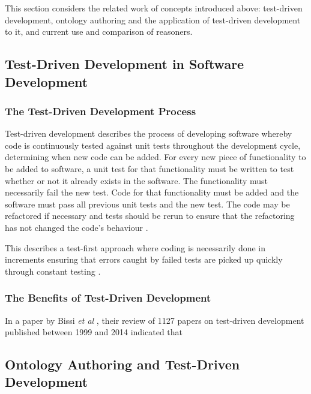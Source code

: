 \documentclass[draft]{sig-alternate-05-2015}
\newcommand{\todo}[1][]{\ifdraft{\ifthenelse{\isempty{#1}}{\hl{(TODO)}}{\hl{(TODO: #1)}}}{}}
\begin{document}
This section considers the related work of concepts introduced above: test-driven development, ontology authoring and the application of test-driven development to it, and current use and comparison of reasoners.

\subsection{Test-Driven Development in Software Development}

\subsubsection{The Test-Driven Development Process}

Test-driven development describes the process of developing software whereby code is continuously tested against unit tests throughout the development cycle, determining when new code can be added. For every new piece of functionality to be added to software, a unit test for that functionality must be written to test whether or not it already exists in the software. The functionality must necessarily fail the new test. Code for that functionality must be added and the software must pass all previous unit tests and the new test. The code may be refactored if necessary and tests should be rerun to ensure that the refactoring has not changed the code's behaviour \cite{kumar2013comparative,DBLP:journals/infsof/PancurC11}.

This describes a test-first approach \cite{DBLP:journals/infsof/BissiNE16} where coding is necessarily done in increments ensuring that errors caught by failed tests are picked up quickly through constant testing \cite{DBLP:journals/iee/MullerH02}.

\subsubsection{The Benefits of Test-Driven Development}

In a paper by Bissi \textit{et al} \cite{DBLP:journals/infsof/BissiNE16}, their review of 1127 papers on test-driven development published between 1999 and 2014 indicated that 

\subsection{Ontology Authoring and Test-Driven Development}

\todo
\end{document}
